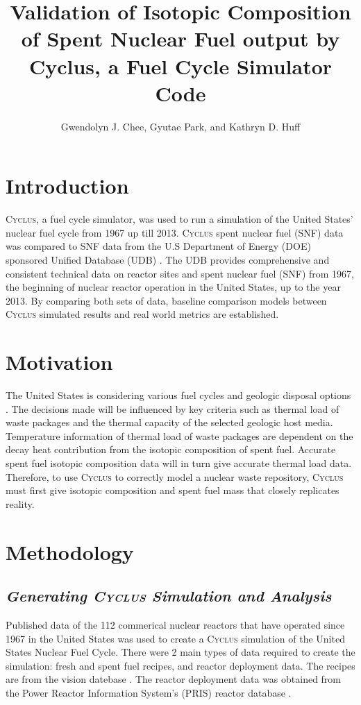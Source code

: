 \documentclass{anstrans}
\title{Validation of Isotopic Composition of Spent Nuclear Fuel output by Cyclus, a Fuel Cycle Simulator Code}
\author{Gwendolyn J. Chee, Gyutae Park, and Kathryn D. Huff}
\institute{
Dept. of Nuclear, Plasma and Radiological Engineering, University of Illinois at Urbana-Champaign \\
gchee2@illinois.edu
}
\newcommand{\Cyclus}{\textsc{Cyclus}\xspace}%
\begin{document}
\section{Introduction}
\Cyclus \cite{huff_fundamentals_2016}, a fuel cycle simulator, was used to run a simulation of the
United States' nuclear fuel cycle from 1967 up till 2013. \Cyclus spent nuclear fuel (SNF) data was compared to SNF data from the U.S Department of Energy (DOE) sponsored Unified Database (UDB) \cite{Peterson_UNF_2017}. The UDB provides comprehensive and consistent technical data on reactor sites and spent nuclear fuel (SNF) from 1967, the beginning of nuclear reactor operation in the United States, up to the year 2013. By comparing both sets of data, baseline comparison models between \Cyclus simulated results and real world metrics are established. 

\section{Motivation}
The United States is considering various fuel cycles and geologic disposal options
\cite{DOE_strategy_2013}. The decisions made will be influenced by key criteria such as thermal load 
of waste packages and the thermal capacity of the selected geologic host media. Temperature information of thermal load of waste packages are dependent on the decay heat contribution from the isotopic composition of spent fuel. Accurate spent fuel isotopic composition data will in turn give accurate thermal load data. Therefore, to use \Cyclus to correctly model a nuclear waste repository, \Cyclus must first give isotopic composition and spent fuel mass that closely replicates reality. 

\section{Methodology}
\subsection{\textit{Generating \Cyclus Simulation and Analysis}}
Published data of the 112 commerical nuclear reactors that have operated since 1967 in the United States was used to create a \Cyclus simulation of the United States Nuclear Fuel Cycle. There were 2 main types of data required to create the simulation: fresh and spent fuel recipes, and reactor deployment data. The recipes are from the vision datebase \cite{vision}. The reactor deployment data was obtained from the Power Reactor Information System's (PRIS) reactor database \cite{IAEA_PRIS_2017}.
\end{document}
